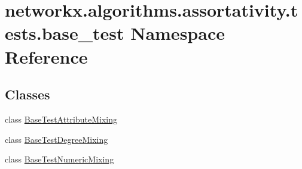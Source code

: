 \hypertarget{namespacenetworkx_1_1algorithms_1_1assortativity_1_1tests_1_1base__test}{}\section{networkx.\+algorithms.\+assortativity.\+tests.\+base\+\_\+test Namespace Reference}
\label{namespacenetworkx_1_1algorithms_1_1assortativity_1_1tests_1_1base__test}
\subsection*{Classes}
\begin{DoxyCompactItemize}
\item 
class \hyperlink{classnetworkx_1_1algorithms_1_1assortativity_1_1tests_1_1base__test_1_1BaseTestAttributeMixing}{Base\+Test\+Attribute\+Mixing}
\item 
class \hyperlink{classnetworkx_1_1algorithms_1_1assortativity_1_1tests_1_1base__test_1_1BaseTestDegreeMixing}{Base\+Test\+Degree\+Mixing}
\item 
class \hyperlink{classnetworkx_1_1algorithms_1_1assortativity_1_1tests_1_1base__test_1_1BaseTestNumericMixing}{Base\+Test\+Numeric\+Mixing}
\end{DoxyCompactItemize}
